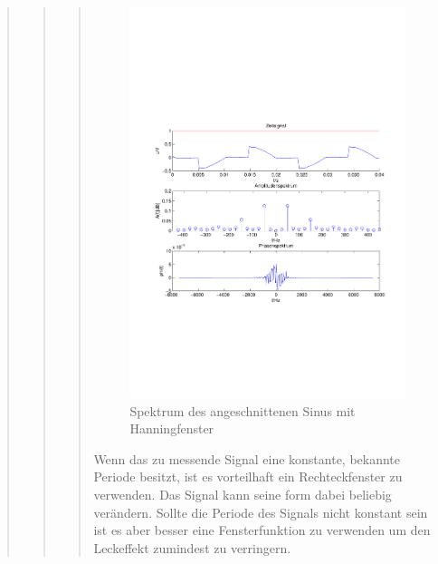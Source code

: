\begin{quote}
\begin{quote}
\begin{quote}
            \begin{figure}[H]
            \centering
                \includegraphics[scale=0.7, trim = 1.5cm 7cm 1.5cm 8.5cm,
                clip]{./Bilder/Phasenanschnittsmessungmitrechteckfenster.pdf}
                    \caption{Spektrum des angeschnittenen Sinus mit Hanningfenster}
            \end{figure}
            
            Wenn das zu messende Signal eine konstante, bekannte Periode besitzt, ist es vorteilhaft ein Rechteckfenster
            zu verwenden. Das Signal kann seine form dabei beliebig verändern. Sollte die Periode des Signals nicht
            konstant sein ist es aber besser eine Fensterfunktion zu verwenden um den Leckeffekt zumindest zu
            verringern.

         \end{quote} %
        

\end{quote}
\end{quote}
